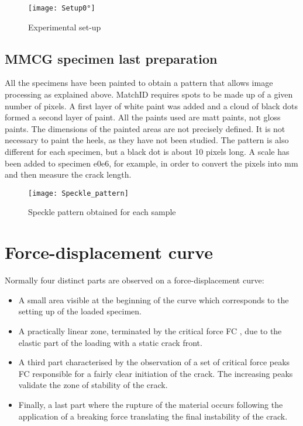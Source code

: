 \begin{figure}[htp]
	\centering
	\texttt{[image: Setup0°]}
	\caption{Experimental set-up}
	\label{fig:Setup0°}
\end{figure}

\subsection{MMCG specimen last preparation}

All the specimens have been painted to obtain a pattern that allows image processing as explained above. MatchID requires spots to be made up of a given number of pixels. A first layer of white paint was added and a cloud of black dots formed a second layer of paint. All the paints used are matt paints, not gloss paints. The dimensions of the painted areas are not precisely defined. It is not necessary to paint the heels, as they have not been studied. The pattern is also different for each specimen, but a black dot is about 10 pixels long. A scale has been added to specimen e0e6, for example, in order to convert the pixels into mm and then measure the crack length. 

\begin{figure}[htp]
	\centering
	\texttt{[image: Speckle\_pattern]}
	\caption{Speckle pattern obtained for each sample}
	\label{fig:Speckle_pattern}
\end{figure}

\section{Force-displacement curve}

Normally four distinct parts are observed on a force-displacement curve:

\begin{itemize}
	\item A small area visible at the beginning of the curve which corresponds to the setting up of the loaded specimen. 
	\item A practically linear zone, terminated by the critical force FC , due to the elastic part of the loading with a static crack front.
	\item A third part characterised by the observation of a set of critical force peaks FC responsible for a fairly clear initiation of the crack. The increasing peaks validate the zone of stability of the crack.
	\item Finally, a last part where the rupture of the material occurs following the application of a breaking force translating the final instability of the crack.
\end{itemize}

